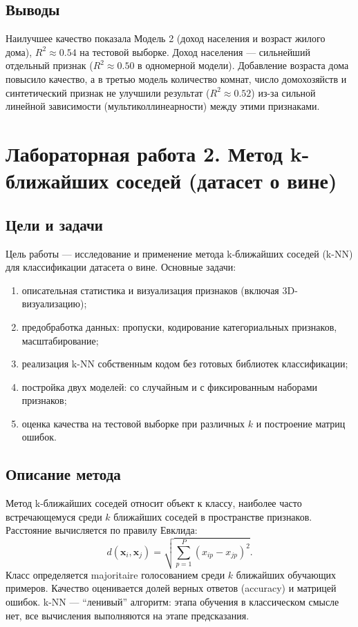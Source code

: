 \documentclass[12pt,a4paper]{article}
\begin{document}
\subsection{Выводы}
Наилучшее качество показала Модель 2 (доход населения и возраст жилого дома), $R^2 \approx 0.54$ на тестовой выборке. Доход населения --- сильнейший отдельный признак ($R^2 \approx 0.50$ в одномерной модели). Добавление возраста дома повысило качество, а в третью модель количество комнат, число домохозяйств и синтетический признак не улучшили результат ($R^2 \approx 0.52$) из-за сильной линейной зависимости (мультиколлинеарности) между этими признаками.

\section{Лабораторная работа 2. Метод k-ближайших соседей (датасет о вине)}

\subsection{Цели и задачи}
Цель работы --- исследование и применение метода k-ближайших соседей (k-NN) для классификации датасета о вине. Основные задачи:
\begin{enumerate}
\item описательная статистика и визуализация признаков (включая 3D-визуализацию);
\item предобработка данных: пропуски, кодирование категориальных признаков, масштабирование;
\item реализация k-NN собственным кодом без готовых библиотек классификации;
\item постройка двух моделей: со случайным и с фиксированным наборами признаков;
\item оценка качества на тестовой выборке при различных $k$ и построение матриц ошибок.
\end{enumerate}

\subsection{Описание метода}
Метод k-ближайших соседей относит объект к классу, наиболее часто встречающемуся среди $k$ ближайших соседей в пространстве признаков. Расстояние вычисляется по правилу Евклида:
\begin{equation}
d(\mathbf{x}_i, \mathbf{x}_j) = \sqrt{\sum_{p=1}^{P} (x_{ip} - x_{jp})^2}.
\end{equation}
Класс определяется majoritaire голосованием среди $k$ ближайших обучающих примеров. Качество оценивается долей верных ответов (accuracy) и матрицей ошибок. k-NN --- ``ленивый'' алгоритм: этапа обучения в классическом смысле нет, все вычисления выполняются на этапе предсказания.
\end{document}
